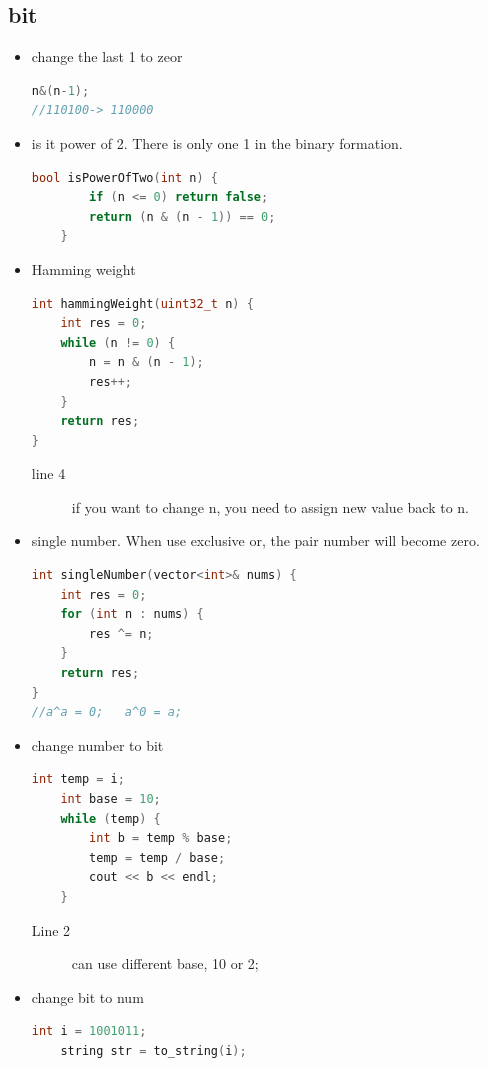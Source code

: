\documentclass[a4paper,11pt,twoside]{book}
\begin{document}
\subsection{bit}
\begin{itemize}
	\item change the last 1 to zeor
\begin{lstlisting}[frame=single, language=c++]	
n&(n-1);
//110100-> 110000
\end{lstlisting}

	\item is it power of 2. There is only one 1 in the binary formation.
\begin{lstlisting}[frame=single, language=c++]	
	bool isPowerOfTwo(int n) {
		if (n <= 0) return false;
		return (n & (n - 1)) == 0;
	}
\end{lstlisting}


	\item Hamming weight
\begin{lstlisting}[frame=single, language=c++]	
int hammingWeight(uint32_t n) {
	int res = 0;
	while (n != 0) {
		n = n & (n - 1);
		res++;
	}
	return res;
}
\end{lstlisting}
\begin{description}
	\item[line 4] if you want to change n, you need to assign new value back to n. 
\end{description}

	
	\item single number. When use exclusive or, the pair number will become zero.
\begin{lstlisting}[frame=single, language=c++]	
int singleNumber(vector<int>& nums) {
	int res = 0;
	for (int n : nums) {
		res ^= n;
	}
	return res;
}
//a^a = 0;   a^0 = a;
\end{lstlisting}

	\item change number to bit
\begin{lstlisting}[frame=single, language=c++]	
	int temp = i;
	int base = 10;
	while (temp) {
		int b = temp % base;
		temp = temp / base;
		cout << b << endl;
	}
\end{lstlisting}	
\begin{description}
	\item[Line 2] can use different base, 10 or 2;	
\end{description}	
	
	\item change bit to num
\begin{lstlisting}[frame=single, language=c++]	
	int i = 1001011;
	string str = to_string(i);
	

\end{lstlisting}
\end{itemize}
\end{document}
